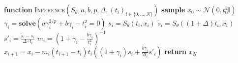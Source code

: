 \documentclass{article}
\theoremstyle{plain}
\theoremstyle{definition}
\theoremstyle{remark}
\newcommand{\cN}{\mathcal{N}}
\begin{document}
\begin{algorithm*}
    \caption{Inference with extended score} \label{alg:main} 
    \begin{algorithmic}[1]
       \STATE \textbf{function} \textsc{Inference}$(S_\theta,a,b,p,\Delta,(t_i)_{i\in\{0,\dots,N\}})$ 
        \STATE \textbf{sample} $x_0\sim\cN(0,t_0^2\mathbb{I})$ 
            \STATE  $\gamma_i =  \mathrm{\textbf{solve}}(a\gamma_i^{2/p} + b\gamma_i -t_i^2 =0)$ 
            \STATE $s_i = S_\theta(t_i,x_i)$ 
            \STATE $\widetilde{s}_i = S_\theta((1+\Delta)t_i,x_i)$
            \STATE $s'_i = \tfrac{\widetilde{s}_i-s_i}{\Delta \cdot t_i}$ 
            \STATE $m_i=(1+\gamma_i-\tfrac{b\gamma_i}{t_i^2})^{-1}$ 
            \STATE $x_{i+1}= x_i-m_i(t_{i+1}-t_i)t_i((1+\gamma_i)s_i+\tfrac{b\gamma_i}{2t_i}s'_i)$ 
        \ENDFOR 
        \STATE \textbf{return} $x_N$
    \end{algorithmic}
\end{algorithm*}



\end{document}
